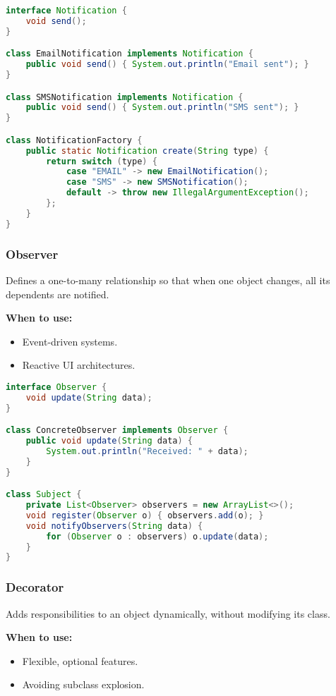 \documentclass[a4paper,12pt]{article}
\begin{document}
\begin{lstlisting}[language=Java]
interface Notification {
    void send();
}

class EmailNotification implements Notification {
    public void send() { System.out.println("Email sent"); }
}

class SMSNotification implements Notification {
    public void send() { System.out.println("SMS sent"); }
}

class NotificationFactory {
    public static Notification create(String type) {
        return switch (type) {
            case "EMAIL" -> new EmailNotification();
            case "SMS" -> new SMSNotification();
            default -> throw new IllegalArgumentException();
        };
    }
}
\end{lstlisting}

\subsubsection{Observer}

Defines a one-to-many relationship so that when one object changes, all its dependents are notified.

\textbf{When to use:}
\begin{itemize}
  \item Event-driven systems.
  \item Reactive UI architectures.
\end{itemize}

\begin{lstlisting}[language=Java]
interface Observer {
    void update(String data);
}

class ConcreteObserver implements Observer {
    public void update(String data) {
        System.out.println("Received: " + data);
    }
}

class Subject {
    private List<Observer> observers = new ArrayList<>();
    void register(Observer o) { observers.add(o); }
    void notifyObservers(String data) {
        for (Observer o : observers) o.update(data);
    }
}
\end{lstlisting}

\subsubsection{Decorator}

Adds responsibilities to an object dynamically, without modifying its class.

\textbf{When to use:}
\begin{itemize}
  \item Flexible, optional features.
  \item Avoiding subclass explosion.
\end{itemize}
\end{document}
